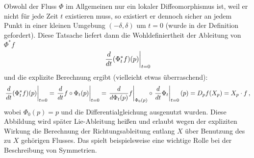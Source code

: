 \documentclass[../H_Analysis_main.tex]{subfiles}
\begin{document}
Obwohl der Fluss $\Phi$ im Allgemeinen nur ein lokaler Diffeomorphismus ist, weil er nicht für jede Zeit $t$ existieren muss, so existiert er dennoch sicher an jedem Punkt in einer kleinen Umgebung $(-\delta, \delta)$ um $t = 0$ (wurde in der Definition gefordert). Diese Tatsache liefert dann die Wohldefiniertheit der Ableitung von $\Phi^*f$%
\begin{equation*}
\eval{\dv{t} \qty(\Phi_t^* f)(p)}_{t = 0}
\end{equation*}
und die explizite Berechnung ergibt (vielleicht etwas überraschend):
\begin{equation*}
\eval{\dv{t} \qty(\Phi_t^* f)(p)}_{t = 0} = \eval{\dv{t} f \circ \Phi_t (p)}_{t = 0} = \eval{\dv{\Phi_t(p)} f}_{\Phi_0(p)} \circ \eval{\dv{t} \Phi_t}_{t = 0} (p) = D_p f (X_p) = X_p \cdot f \, ,
\end{equation*}
wobei $\Phi_0(p) = p$ und die Differentialgleichung ausgenutzt wurden. Diese Abbildung wird später Lie-Ableitung heißen und erlaubt wegen der expliziten Wirkung die Berechnung der Richtungsableitung entlang $X$ über Benutzung des zu $X$ gehörigen Flusses. Das spielt beispielsweise eine wichtige Rolle bei der Beschreibung von Symmetrien.

\end{document}
